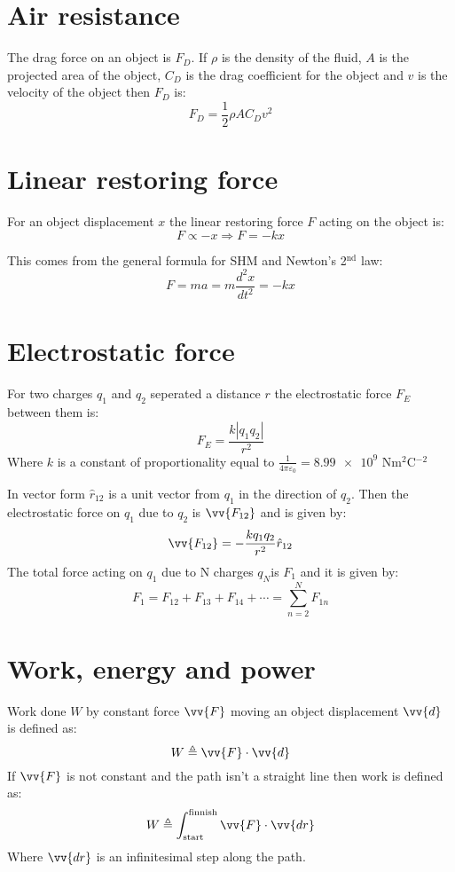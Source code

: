 \documentclass{article}
\begin{document}
\section*{Air resistance}

The drag force on an object is \(F_D\). If \(\rho\) is the density of the fluid, \(A\) is the projected area of the object, \(C_D\) is the drag coefficient for the object and \(v\) is the velocity of the object then \(F_D\) is:
\[F_D=\frac{1}{2}\rho AC_Dv^2\]

\section*{Linear restoring force}

For an object displacement \(x\) the linear restoring force \(F\) acting on the object is:
\[F\propto -x\Rightarrow F=-kx\]

This comes from the general formula for SHM and Newton's 2\(^\text{nd}\) law:
\[F=ma=m\frac{d^2x}{dt^2}=-kx\]

\section*{Electrostatic force}

For two charges \(q_1\) and \(q_2\) seperated a distance \(r\) the electrostatic force \(F_E\) between them is:
\[F_E=\frac{k|q_1q_2|}{r^2}\]
Where \(k\) is a constant of proportionality equal to \(\frac{1}{4\pi\varepsilon_0}=\num{8.99e9}\) Nm\(^2\)C\(^{-2}\)

In vector form \(\hat{r}_{12}\) is a unit vector from \(q_1\) in the direction of \(q_2\). Then the electrostatic force on \(q_1\) due to \(q_2\) is \(\vv{F_{12}}\) and is given by:
\[\vv{F_{12}}=-\frac{kq_1q_2}{r^2}\hat{r}_{12}\]
The total force acting on \(q_1\) due to N charges \(q_N\)is \(F_1\) and it is given by:
\[F_1=F_{12}+F_{13}+F_{14}+\cdots=\sum_{n=2}^{N} F_{1n}\]

\section*{Work, energy and power}

Work done \(W\) by constant force \(\vv{F}\) moving an object displacement \(\vv{d}\) is defined as:
\[W\triangleq\vv{F}\cdot\vv{d}\]
If \(\vv{F}\) is not constant and the path isn't a straight line then work is defined as:
\[W\triangleq\int_{\text{start}}^{\text{finnish}}\vv{F}\cdot\vv{dr}\]
Where \(\vv{dr}\) is an infinitesimal step along the path.
\end{document}
